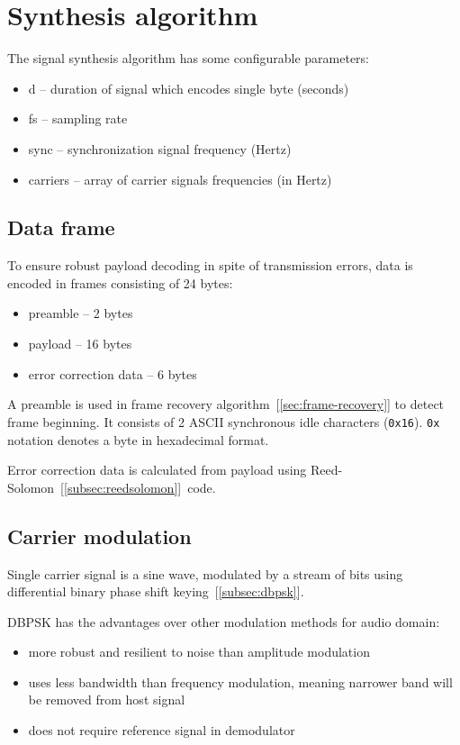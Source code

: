 \section{Synthesis algorithm}

The signal synthesis algorithm has some configurable parameters:

\begin{itemize}
\item d -- duration of signal which encodes single byte (seconds)
\item fs -- sampling rate
\item sync -- synchronization signal frequency (Hertz)
\item carriers -- array of carrier signals frequencies (in Hertz)
\end{itemize}

\subsection{Data frame}

To ensure robust payload decoding in spite of transmission errors, data is encoded in frames consisting of 24 bytes:

\begin{itemize}
\item preamble -- 2 bytes
\item payload -- 16 bytes
\item error correction data -- 6 bytes
\end{itemize}

A preamble is used in frame recovery algorithm~[\ref{sec:frame-recovery}] to detect frame beginning. It consists of 2 ASCII synchronous idle characters (\texttt{0x16}).
\texttt{0x} notation denotes a byte in hexadecimal format.

Error correction data is calculated from payload using Reed-Solomon~[\ref{subsec:reedsolomon}]~code.

\subsection{Carrier modulation}

Single carrier signal is a sine wave, modulated by a stream of bits using differential binary phase shift keying~[\ref{subsec:dbpsk}].

DBPSK has the advantages over other modulation methods for audio domain:~\cite{Applidium}

\begin{itemize}
\item more robust and resilient to noise than amplitude modulation
\item uses less bandwidth than frequency modulation, meaning narrower band will be removed from host signal
\item does not require reference signal in demodulator
\end{itemize}

